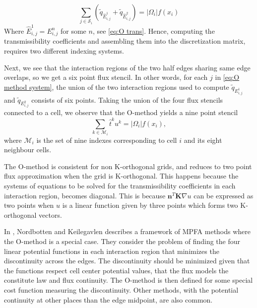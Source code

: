 \documentclass[../Main/main.tex]{subfiles}
\begin{document}
	\begin{equation}\label{eq:O method system}
			\sum_{j\in \mathcal{S}_i} (\tilde{q}_{\hat{E}_{i,j}^1} + \tilde{q}_{\hat{E}_{i,j}^2}) = |\Omega_i|f(x_i) 
	\end{equation}
	Where $\hat{E}_{i,j}^1 = E_{i,j}^n$ for some $n$, see \eqref{eq:O trans}. Hence, computing the transmissibility coefficients and assembling them into the discretization matrix, requires two different indexing systems.\par
	Next, we see that the interaction regions of the two half edges sharing same edge overlaps, so we get a six point flux stencil. In other words, for each $j$ in \eqref{eq:O method system}, the union of the two interaction regions used to compute $\tilde{q}_{E_{i,j}^1}$ and $\tilde{q}_{E_{i,j}^2}$ consists of six points.
	Taking the union of the four flux stencils connected to a cell, we observe that the O-method yields a nine point stencil
	\begin{equation*}
		\sum_{k\in\mathcal{M}_i} \hat{t}^{k}u^k = |\Omega_i|f(x_i),
	\end{equation*}
	where $\mathcal{M}_i$ is the set of nine indexes corresponding to cell $i$ and its eight neighbour cells.\par
	The O-method is consistent for non K-orthogonal grids, and reduces to two point flux approximation when the grid is K-orthogonal. This happens because the systems of equations to be solved for the transmissibility coefficients in each interaction region, becomes diagonal. This is because $\bm{n}^T \bm{K} \nabla u$ can be expressed as two points when $u$ is a linear function given by three points which forms two K-orthogonal vectors.
	\par
	In \cite{nordbotten2020introduction}, Nordbotten and Keilegavlen describes a framework of MPFA methods where the O-method is a special case. They consider the problem of finding the four linear potential functions in each interaction region that minimizes the discontinuity across the edges. The discontinuity should be minimized given that the functions respect cell center potential values, that the flux models the constitute law and flux continuity. The O-method is then defined for some special cost function measuring the discontinuity. Other methods, with the potential continuity at other places than the edge midpoint, are also common.
	\par 
\end{document}
